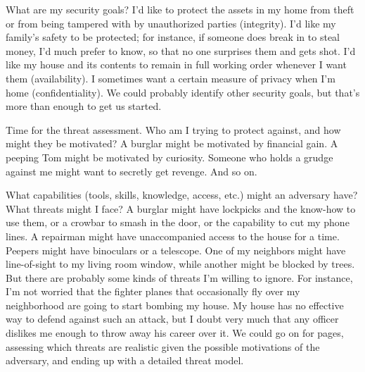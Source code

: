 \documentclass[11pt]{article}
\begin{document}
What are my security goals? I'd like to protect the
assets in my home from theft or from being tampered with by
unauthorized parties (integrity). I'd like my family's safety to be
protected; for instance, if someone does break in to steal money, I'd
much prefer to know, so that no one surprises them and gets shot. I'd
like my house and its contents to remain in full working order
whenever I want them (availability).  I
sometimes want a certain measure of privacy when I'm home
(confidentiality). We could probably identify other security goals, but
that's more than enough to get us started.

Time for the threat
assessment. Who am I trying to protect against, and how might they be
motivated? A burglar might be motivated by financial gain. A peeping
Tom might be motivated by curiosity. Someone who holds a grudge
against me might want to secretly get revenge. And so on.

What capabilities (tools, skills, knowledge, access, etc.) might an
adversary have? What threats might I face? A burglar might have
lockpicks and the know-how to use them, or a crowbar to smash in the
door, or the capability to cut my phone lines. A repairman might have
unaccompanied access to the house for a time. Peepers might have
binoculars or a telescope. One of my neighbors might have
line-of-sight to my living room window, while another might be blocked
by trees. But there are probably some kinds of threats I'm willing to
ignore. For instance, I'm not worried that the fighter planes that 
occasionally fly over my neighborhood 
are going to start bombing my house. My house has no
effective way to defend against such an attack, but I doubt very much
that any officer dislikes me enough to throw away his career over
it. We could go on for pages, assessing which threats are realistic
given the possible motivations of the adversary, and ending up with a
detailed threat model. 
\end{document}
